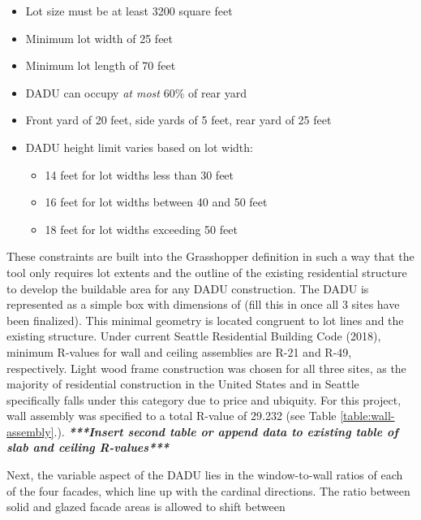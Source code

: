 \documentclass[sagev,doublespace,times,Review]{sagej}
\begin{document}
\begin{itemize}
	\item Lot size must be at least 3200 square feet
	\item Minimum lot width of 25 feet
	\item Minimum lot length of 70 feet
	\item DADU can occupy \textit{at most} 60\% of rear yard	
	\item Front yard of 20 feet, side yards of 5 feet, rear yard of 25  feet
	\item DADU height limit varies based on lot width: \begin{itemize}
	\item 14 feet for lot widths less than 30 feet
	\item 16 feet for lot widths between 40 and 50 feet
	\item 18 feet for lot widths exceeding 50 feet \end{itemize}
\end{itemize}

These constraints are built into the Grasshopper definition in such a way that the tool only requires lot extents and the outline of the existing residential structure to develop the buildable area for any DADU construction. The DADU is represented as a simple box with dimensions of (fill this in once all 3 sites have been finalized). This minimal geometry is located congruent to lot lines and the existing structure. Under current Seattle Residential Building Code (2018), minimum R-values for wall and ceiling assemblies are R-21 and R-49, respectively. Light wood frame construction was chosen for all three sites, as the majority of residential construction in the United States and in Seattle specifically falls under this category due to price and ubiquity. For this project, wall assembly was specified to a total R-value of 29.232 (see Table \ref{table:wall-assembly}.). 
\textit{\textbf{***Insert second table or append data to existing table of slab and ceiling R-values***}}

Next, the variable aspect of the DADU lies in the window-to-wall ratios of each of the four facades, which line up with the cardinal directions. The ratio between solid and glazed facade areas is allowed to shift between 
\end{document}
